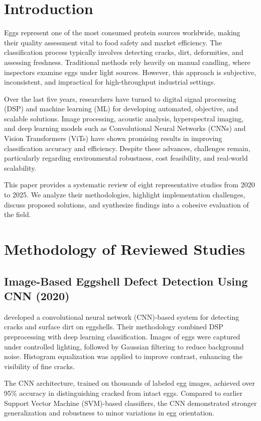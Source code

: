 \documentclass[conference]{IEEEtran}
\begin{document}
	\section{Introduction}
	Eggs represent one of the most consumed protein sources worldwide, making their quality assessment vital to food safety and market efficiency. The classification process typically involves detecting cracks, dirt, deformities, and assessing freshness. Traditional methods rely heavily on manual candling, where inspectors examine eggs under light sources. However, this approach is subjective, inconsistent, and impractical for high-throughput industrial settings.  
	
	Over the last five years, researchers have turned to digital signal processing (DSP) and machine learning (ML) for developing automated, objective, and scalable solutions. Image processing, acoustic analysis, hyperspectral imaging, and deep learning models such as Convolutional Neural Networks (CNNs) and Vision Transformers (ViTs) have shown promising results in improving classification accuracy and efficiency. Despite these advances, challenges remain, particularly regarding environmental robustness, cost feasibility, and real-world scalability.  
	
	This paper provides a systematic review of eight representative studies from 2020 to 2025. We analyze their methodologies, highlight implementation challenges, discuss proposed solutions, and synthesize findings into a cohesive evaluation of the field.
	
	\section{Methodology of Reviewed Studies}
	
	\subsection{Image-Based Eggshell Defect Detection Using CNN (2020)}
	\cite{zhang2020cnn} developed a convolutional neural network (CNN)-based system for detecting cracks and surface dirt on eggshells. Their methodology combined DSP preprocessing with deep learning classification. Images of eggs were captured under controlled lighting, followed by Gaussian filtering to reduce background noise. Histogram equalization was applied to improve contrast, enhancing the visibility of fine cracks.  
	
	The CNN architecture, trained on thousands of labeled egg images, achieved over 95\% accuracy in distinguishing cracked from intact eggs. Compared to earlier Support Vector Machine (SVM)-based classifiers, the CNN demonstrated stronger generalization and robustness to minor variations in egg orientation.  
	
\end{document}
